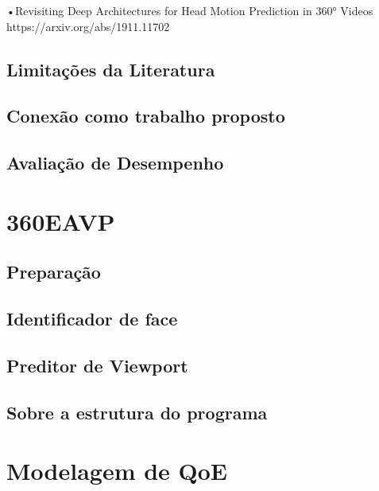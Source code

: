 •Revisiting Deep Architectures for Head Motion Prediction in 360° Videos
https://arxiv.org/abs/1911.11702


\subsection{Limitações da Literatura}
\subsection{Conexão como trabalho proposto}
\subsection{Avaliação de Desempenho}


\section{360EAVP}
\subsection{Preparação}
\subsection{Identificador de face}
\subsection{Preditor de Viewport}
\subsection{Sobre a estrutura do programa}

\section{Modelagem de QoE}
